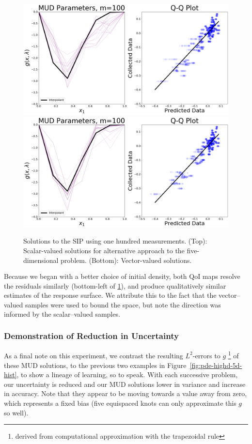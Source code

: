 \begin{figure}[htbp]
\centering
  \includegraphics[width=0.95\linewidth]{figures/pde-highd/pde-highd_pair_D-alt-5-1_m100.png}
  \includegraphics[width=0.95\linewidth]{figures/pde-highd/pde-highd_pair_D-alt-5-5_m100.png}
\caption{Solutions to the SIP using one hundred measurements.
(Top): Scalar-valued solutions for alternative approach to the five-dimensional problem.
(Bottom): Vector-valued solutions.
}
\label{fig:pde-highd-5d-alt-mud}
\end{figure}

Because we began with a better choice of initial density, both QoI maps resolve the residuals similarly (bottom-left of \ref{fig:pde-highd-5d-alt-mud}), and produce qualitatively similar estimates of the response surface. We attribute this to the fact that the vector--valued samples were used to bound the space, but note the direction was informed by the scalar--valued samples.

\subsubsection{Demonstration of Reduction in Uncertainty}

As a final note on this experiment, we contrast the resulting $L^2$-errors to $g$ \footnote{derived from computational approximation with the trapezoidal rule} of these MUD solutions, to the previous two examples in Figure~\ref{fig:pde-highd-5d-hist}, to show a lineage of learning, so to speak.
With each successive problem, our uncertainty is reduced and our MUD solutions lower in variance and increase in accuracy.
Note that they appear to be moving towards a value away from zero, which represents a fixed bias (five equispaced knots can only approximate this $g$ so well).


